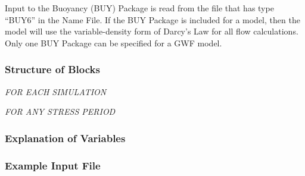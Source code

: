 Input to the Buoyancy (BUY) Package is read from the file that has type ``BUY6'' in the Name File.  If the BUY Package is included for a model, then the model will use the variable-density form of Darcy's Law for all flow calculations.  Only one BUY Package can be specified for a GWF model.

\vspace{5mm}
\subsubsection{Structure of Blocks}

\vspace{5mm}
\noindent \textit{FOR EACH SIMULATION}

\vspace{5mm}
\noindent \textit{FOR ANY STRESS PERIOD}


\vspace{5mm}
\subsubsection{Explanation of Variables}
\begin{description}

\end{description}

\vspace{5mm}
\subsubsection{Example Input File}


